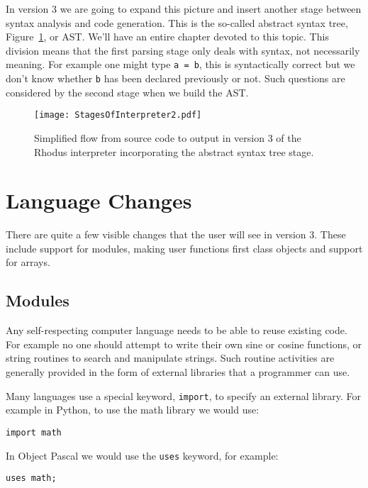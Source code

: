 In version 3 we are going to expand this picture and insert another stage between syntax analysis and code generation. This is the so-called abstract syntax tree, Figure~\ref{fig:simpleInterpreter2}, or AST. We'll have an entire chapter devoted to this topic. This division means that the first parsing stage only deals with syntax, not necessarily meaning. For example one might type {\tt a = b}, this is syntactically correct but we don't know whether {\tt b} has been declared previously or not. Such questions are considered by the second stage when we build the AST.

\begin{figure}[htpb]
\centering
\texttt{[image: StagesOfInterpreter2.pdf]}
\caption{Simplified flow from source code to output in version 3 of the Rhodus interpreter incorporating the abstract syntax tree stage.}
\label{fig:simpleInterpreter2}
\end{figure}

\section{Language Changes}

There are quite a few  visible changes that the user will see in version 3. These include support for modules, making user functions first class objects and support for arrays.

\subsection{Modules}

Any self-respecting computer language needs to be able to reuse existing code. For example no one should attempt to write their own sine or cosine functions, or string routines to search and manipulate strings. Such routine activities are generally provided in the form of external libraries that a programmer can use.

Many languages use a special keyword, {\tt import}, to specify an external library. For example in Python, to use the math library we would use:

\begin{lstlisting}
import math
\end{lstlisting}

In Object Pascal we would use the {\tt uses} keyword, for example:

\begin{lstlisting}
uses math;
\end{lstlisting}

